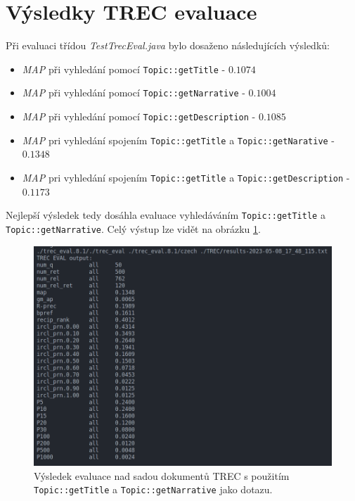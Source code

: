 \documentclass{article}
\begin{document}
\section{Výsledky TREC evaluace}
Při evaluaci třídou \textit{TestTrecEval.java} bylo dosaženo následujících výsledků:
\begin{itemize}
    \item \textit{MAP} při vyhledání pomocí \texttt{Topic::getTitle} - \(0.1074\)
    \item \textit{MAP} při vyhledání pomocí \texttt{Topic::getNarrative} - \(0.1004\)
    \item \textit{MAP} při vyhledání pomocí \texttt{Topic::getDescription} - \(0.1085\)
    \item \textit{MAP} pri vyhledání spojením \texttt{Topic::getTitle} a \texttt{Topic::getNarative} - \(0.1348\)
    \item \textit{MAP} pri vyhledání spojením \texttt{Topic::getTitle} a \texttt{Topic::getDescription} - \(0.1173\)
\end{itemize}

Nejlepší výsledek tedy dosáhla evaluace vyhledáváním \texttt{Topic::getTitle} a \texttt{Topic::getNarrative}. Celý výstup lze vidět na obrázku \ref{fig:trec-eval}.

\begin{figure}[!h]
    \centering
    \includegraphics[width=\columnwidth]{img/trec-eval.png}
    \caption{Výsledek evaluace nad sadou dokumentů TREC s použitím \texttt{Topic::getTitle} a \texttt{Topic::getNarrative} jako dotazu.}
    \label{fig:trec-eval}
\end{figure}
\end{document}
